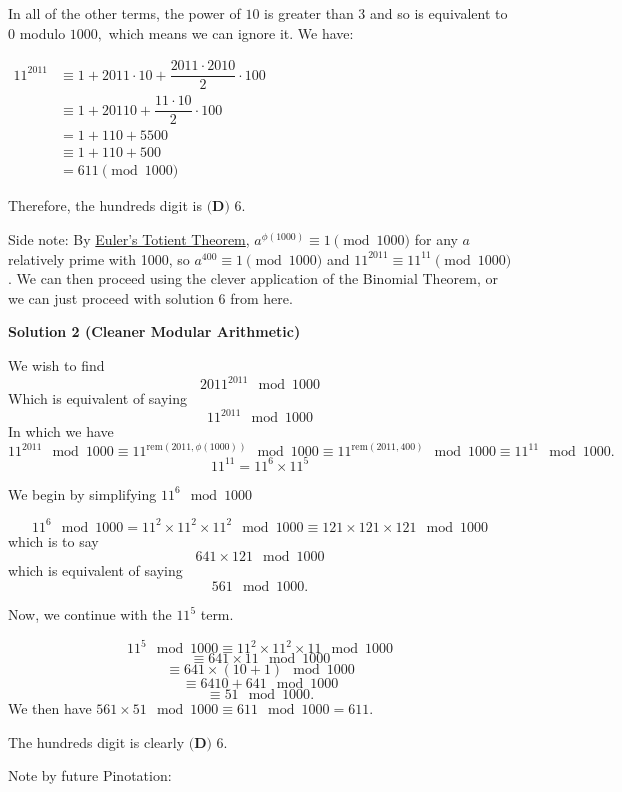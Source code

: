 \begin{enumerate}
 In all of the other terms, the power of $10$ is greater than $3$ and so is equivalent to $0$ modulo $1000,$ which means we can ignore it. We have:

 $\begin{aligned}11^{2011} &\equiv 1 + 2011\cdot 10 + \dfrac{2011 \cdot 2010}{2} \cdot 100 \\ &\equiv 1+20110 + \dfrac{11\cdot 10}{2} \cdot 100\\ &= 1 + 110 + 5500\\ &\equiv 1 + 110 + 500\\&=611 \pmod{1000} \end{aligned}$

 Therefore, the hundreds digit is $\boxed{\textbf{(D) } 6}.$

 Side note: By \href{https://artofproblemsolving.com/wiki/index.php?title=Euler\%27s\_Totient\_Theorem}{Euler's Totient Theorem}, $a^{\phi (1000)} \equiv 1 \pmod{1000}$ for any $a$ relatively prime with 1000, so $a^{400} \equiv 1 \pmod{1000}$ and $11^{2011} \equiv 11^{11} \pmod{1000}$. We can then proceed using the clever application of the Binomial Theorem, or we can just proceed with solution 6 from here.

 



\textbf{Solution 2 (Cleaner Modular Arithmetic)}

We wish to find
 \[2011^{2011} \mod 1000\]Which is equivalent of saying
 \[11^{2011} \mod 1000\]In which we have
 \[11^{2011} \mod 1000 \equiv 11^{\text{rem}(2011, \phi(1000))} \mod 1000 \equiv 11^{\text{rem}(2011, 400)} \mod 1000 \equiv 11^{11} \mod 1000.\]
 \[11^{11} = 11^6 \times 11^5\]

 We begin by simplifying $11^6 \mod 1000$

 \[11^6 \mod 1000 = 11^2 \times 11^2 \times 11^2  \mod 1000 \equiv 121 \times 121 \times 121 \mod 1000\]which is to say
 \[641 \times 121 \mod 1000\]which is equivalent of saying
 \[561 \mod 1000.\]

 Now, we continue with the $11^5$ term.

 
 \[11^5 \mod 1000 \equiv 11^2 \times 11^2 \times 11 \mod 1000\]
 \[\equiv 641 \times 11 \mod 1000\]
 \[\equiv 641 \times (10+1) \mod 1000\]
 \[\equiv 6410 + 641 \mod 1000\]
 \[\equiv 51 \mod 1000.\]We then have $561 \times 51 \mod 1000 \equiv 611 \mod 1000 = 611$.

 The hundreds digit is clearly $\boxed{\textbf{(D) } 6}.$

 Note by future Pinotation:


\end{enumerate}
